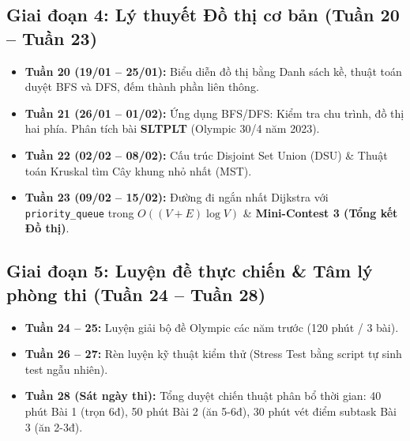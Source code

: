 \documentclass[11pt,a4paper]{article}
\begin{document}
\subsection*{\color{AsianBlue}Giai đoạn 4: Lý thuyết Đồ thị cơ bản (Tuần 20 -- Tuần 23)}
\begin{itemize}
    \setlength{\itemsep}{1.5pt}
    \item \textbf{Tuần 20 (19/01 -- 25/01):} Biểu diễn đồ thị bằng Danh sách kề, thuật toán duyệt BFS và DFS, đếm thành phần liên thông.
    \item \textbf{Tuần 21 (26/01 -- 01/02):} Ứng dụng BFS/DFS: Kiểm tra chu trình, đồ thị hai phía. Phân tích bài \textbf{SLTPLT} (Olympic 30/4 năm 2023).
    \item \textbf{Tuần 22 (02/02 -- 08/02):} Cấu trúc Disjoint Set Union (DSU) \& Thuật toán Kruskal tìm Cây khung nhỏ nhất (MST).
    \item \textbf{Tuần 23 (09/02 -- 15/02):} Đường đi ngắn nhất Dijkstra với \texttt{priority\_queue} trong $O((V+E)\log V)$ \& \textbf{Mini-Contest 3 (Tổng kết Đồ thị)}.
\end{itemize}

\subsection*{\color{AsianBlue}Giai đoạn 5: Luyện đề thực chiến \& Tâm lý phòng thi (Tuần 24 -- Tuần 28)}
\begin{itemize}
    \setlength{\itemsep}{1.5pt}
    \item \textbf{Tuần 24 -- 25:} Luyện giải bộ đề Olympic các năm trước (120 phút / 3 bài).
    \item \textbf{Tuần 26 -- 27:} Rèn luyện kỹ thuật kiểm thử (Stress Test bằng script tự sinh test ngẫu nhiên).
    \item \textbf{Tuần 28 (Sát ngày thi):} Tổng duyệt chiến thuật phân bổ thời gian: 40 phút Bài 1 (trọn 6đ), 50 phút Bài 2 (ăn 5-6đ), 30 phút vét điểm subtask Bài 3 (ăn 2-3đ).
\end{itemize}
\end{document}
